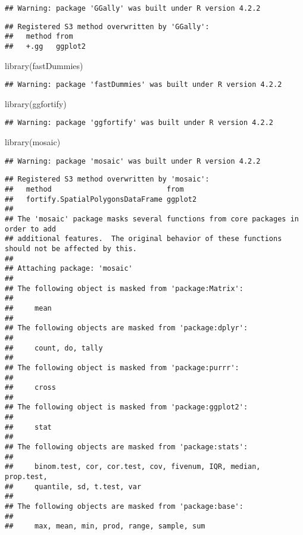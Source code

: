 \documentclass[
]{article}
\newenvironment{Shaded}{\begin{snugshade}}{\end{snugshade}}
\newcommand{\FunctionTok}[1]{\textcolor[rgb]{0.00,0.00,0.00}{#1}}
\newcommand{\NormalTok}[1]{#1}
\newcommand{\StringTok}[1]{\textcolor[rgb]{0.31,0.60,0.02}{#1}}
\begin{document}
\begin{verbatim}
## Warning: package 'GGally' was built under R version 4.2.2
\end{verbatim}

\begin{verbatim}
## Registered S3 method overwritten by 'GGally':
##   method from   
##   +.gg   ggplot2
\end{verbatim}

\begin{Shaded}
\begin{Highlighting}[]
\FunctionTok{library}\NormalTok{(}\StringTok{\textquotesingle{}fastDummies\textquotesingle{}}\NormalTok{)}
\end{Highlighting}
\end{Shaded}

\begin{verbatim}
## Warning: package 'fastDummies' was built under R version 4.2.2
\end{verbatim}

\begin{Shaded}
\begin{Highlighting}[]
\FunctionTok{library}\NormalTok{(}\StringTok{\textquotesingle{}ggfortify\textquotesingle{}}\NormalTok{)}
\end{Highlighting}
\end{Shaded}

\begin{verbatim}
## Warning: package 'ggfortify' was built under R version 4.2.2
\end{verbatim}

\begin{Shaded}
\begin{Highlighting}[]
\FunctionTok{library}\NormalTok{(}\StringTok{\textquotesingle{}mosaic\textquotesingle{}}\NormalTok{)}
\end{Highlighting}
\end{Shaded}

\begin{verbatim}
## Warning: package 'mosaic' was built under R version 4.2.2
\end{verbatim}

\begin{verbatim}
## Registered S3 method overwritten by 'mosaic':
##   method                           from   
##   fortify.SpatialPolygonsDataFrame ggplot2
## 
## The 'mosaic' package masks several functions from core packages in order to add 
## additional features.  The original behavior of these functions should not be affected by this.
## 
## Attaching package: 'mosaic'
## 
## The following object is masked from 'package:Matrix':
## 
##     mean
## 
## The following objects are masked from 'package:dplyr':
## 
##     count, do, tally
## 
## The following object is masked from 'package:purrr':
## 
##     cross
## 
## The following object is masked from 'package:ggplot2':
## 
##     stat
## 
## The following objects are masked from 'package:stats':
## 
##     binom.test, cor, cor.test, cov, fivenum, IQR, median, prop.test,
##     quantile, sd, t.test, var
## 
## The following objects are masked from 'package:base':
## 
##     max, mean, min, prod, range, sample, sum
\end{verbatim}
\end{document}
